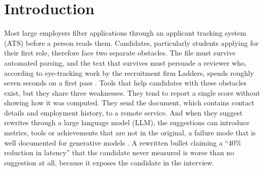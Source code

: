 \documentclass[3p,times,procedia]{elsarticle}
\begin{document}

\vspace*{-6pt}

\section{Introduction}
\label{sec:intro}

Most large employers filter applications through an applicant tracking system (ATS) before a person reads them. Candidates, particularly students applying for their first role, therefore face two separate obstacles. The file must survive automated parsing, and the text that survives must persuade a reviewer who, according to eye-tracking work by the recruitment firm Ladders, spends roughly seven seconds on a first pass \cite{ladders2018}. Tools that help candidates with these obstacles exist, but they share three weaknesses. They tend to report a single score without showing how it was computed. They send the document, which contains contact details and employment history, to a remote service. And when they suggest rewrites through a large language model (LLM), the suggestions can introduce metrics, tools or achievements that are not in the original, a failure mode that is well documented for generative models \cite{ji2023hallucination}. A rewritten bullet claiming a ``40\% reduction in latency'' that the candidate never measured is worse than no suggestion at all, because it exposes the candidate in the interview.
\end{document}
